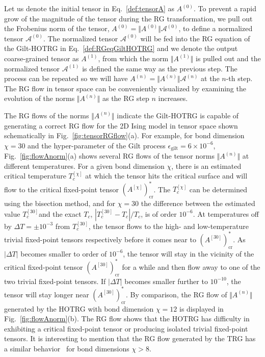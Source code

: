 \documentclass[aps,prb,reprint,superscriptaddress,floatfix]{revtex4-2}
\begin{document}
Let us denote the initial tensor in Eq.~\eqref{def:tensorA} as $A^{(0)}$. 
To prevent a rapid grow of the magnitude of the tensor during the RG transformation, we pull out the Frobenius norm of the tensor, $A^{(0)} = \Vert A^{(0)}\Vert \mathcal{A}^{(0)}$, to define a normalized tensor $\mathcal{A}^{(0)}$. 
The normalized tensor $\mathcal{A}^{(0)}$ will be fed into the RG equation of the Gilt-HOTRG in Eq.~\eqref{def:RGeqGiltHOTRG} and we denote the output coarse-grained tensor as $A^{(1)}$, from which the norm $\Vert A^{(1)}\Vert$ is pulled out and the normalized tensor $\mathcal{A}^{(1)}$ is defined the same way as the previous step. 
The process can be repeated so we will have $A^{(n)} = \Vert A^{(n)}\Vert \mathcal{A}^{(n)}$ at the $n$-th step. 
The RG flow in tensor space can be conveniently visualized by examining the evolution of the norms $\Vert A^{(n)}\Vert$ as the RG step $n$ increases.
%

The RG flows of the norms $\Vert A^{(n)} \Vert$ indicate the Gilt-HOTRG is capable of generating a correct RG flow for the 2D Ising model in tensor space shown schematically in Fig.~\ref{fig:tensorRGflow}(a). 
For example, for bond dimension $\chi = 30$ and the hyper-parameter of the Gilt process $\epsilon_{\text{gilt}} = 6\times 10^{-6}$, Fig.~\ref{fig:flowAnorm}(a) shows several RG flows of the tensor norms $\Vert A^{(n)} \Vert$ at different temperatures. 
For a given bond dimension $\chi$, there is an estimated critical temperature $T_c^{[\chi]}$ at which the tensor hits the critical surface and will flow to the critical fixed-point tensor $(A^{[\chi]})^*_{\text{cr}}$. 
The $T_c^{[\chi]}$ can be determined using the bisection method, and for $\chi = 30$ the difference between the estimated value $T_c^{[30]}$and the exact $T_c$, $|T_c^{[30]} - T_c| / T_c$, is of order $10^{-6}$. 
At temperatures off by $\Delta T = \pm 10^{-3}$ from $T_c^{[30]}$, the tensor flows to the high- and low-temperature trivial fixed-point tensors respectively before it comes near to $(A^{[30]})^*_{\text{cr}}$. 
As $|\Delta T|$ becomes smaller to order of $10^{-6}$, the tensor will stay in the vicinity of the critical fixed-point tensor $(A^{[30]})^*_{\text{cr}}$ for a while and then flow away to one of the two trivial fixed-point tensors. 
If $|\Delta T|$ becomes smaller further to $10^{-10}$, the tensor will stay longer near $(A^{[30]})^*_{\text{cr}}$. 
By comparison, the RG flow of $\Vert A^{(n)}\Vert$ generated by the HOTRG with bond dimension $\chi = 12$ is displayed in Fig.~\ref{fig:flowAnorm}(b). 
The RG flow shows that the HOTRG has difficulty in exhibiting a critical fixed-point tensor or producing isolated trivial fixed-point tensors. 
It is interesting to mention that the RG flow generated by the TRG has a similar behavior~\cite{Berker2008} for bond dimensions $\chi > 8$.
%
\end{document}
